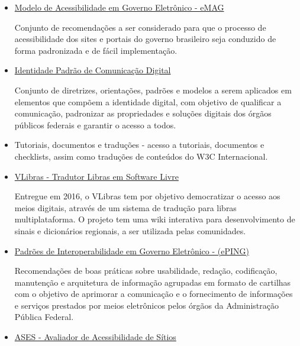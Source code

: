 \documentclass[
  12pt,
  openright,
  twoside,
  a4paper,
  english,
  french,
  spanish,
  brazil
]{abntex2}
\begin{document}
\begin{itemize}
  \item
    \href{
      https://www.gov.br/governodigital/pt-br/acessibilidade-e-usuario/acessibilidade-digital/eMAGv31.pdf
    }{Modelo de Acessibilidade em Governo Eletrônico - eMAG}

    Conjunto de recomendações a ser considerado para que o processo de
    acessibilidade dos sites e portais do governo brasileiro seja conduzido de
    forma padronizada e de fácil implementação.

  \item
    \href{
      http://www.secom.gov.br/atuacao/comunicacao-digital
    }{Identidade Padrão de Comunicação Digital}

    Conjunto de diretrizes, orientações, padrões e modelos a serem aplicados em
    elementos que compõem a identidade digital, com objetivo de qualificar a
    comunicação, padronizar as propriedades e soluções digitais dos órgãos
    públicos federais e garantir o acesso a todos.

  \item
    Tutoriais, documentos e traduções - acesso a tutoriais, documentos e
    checklists, assim como traduções de conteúdos do W3C Internacional.

  \item
    \href{https://vlibras.gov.br/}{VLibras - Tradutor Libras em Software Livre}

    Entregue em 2016, o VLibras tem por objetivo democratizar o acesso aos meios
    digitais, através de um sistema de tradução para libras multiplataforma. O
    projeto tem uma wiki interativa para desenvolvimento de sinais e dicionários
    regionais, a ser utilizada pelas comunidades.

  \item
    \href{
      https://www.gov.br/governodigital/pt-br/governanca-de-dados/padroes-de-interoperabilidade
    }{Padrões de Interoperabilidade em Governo Eletrônico - (ePING)}

    Recomendações de boas práticas sobre usabilidade, redação, codificação,
    manutenção e arquitetura de informação agrupadas em formato de cartilhas com
    o objetivo de aprimorar a comunicação e o fornecimento de informações e
    serviços prestados por meios eletrônicos pelos órgãos da Administração
    Pública Federal.

  \item
    \href{
      https://asesweb.governoeletronico.gov.br/
    }{ASES - Avaliador de Acessibilidade de Sítios}


\end{itemize}
\end{document}
